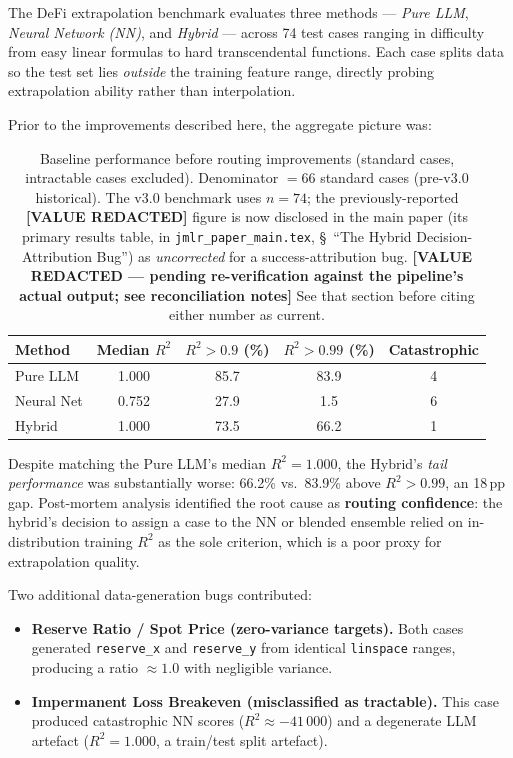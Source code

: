 \documentclass[twoside,11pt]{article}
\begin{document}
The DeFi extrapolation benchmark evaluates three methods --- \emph{Pure LLM},
\emph{Neural Network (NN)}, and \emph{Hybrid} --- across 74 test cases ranging
in difficulty from easy linear formulas to hard transcendental functions.
Each case splits data so the test set lies \emph{outside} the training feature
range, directly probing extrapolation ability rather than interpolation.

Prior to the improvements described here, the aggregate picture was:

\begin{table}[h]
\centering
\caption{Baseline performance before routing improvements (standard cases,
         intractable cases excluded). Denominator $= 66$ standard cases
         (pre-v3.0 historical). The v3.0 benchmark uses $n=74$; the
         previously-reported \textbf{[VALUE REDACTED]} figure is now disclosed in the
         main paper (its primary results table, in
         \texttt{jmlr\_paper\_main.tex}, \S~``The Hybrid
         Decision-Attribution Bug'') as \emph{uncorrected} for a
         success-attribution bug. \textbf{[VALUE REDACTED --- pending re-verification against the pipeline's actual output; see reconciliation notes]}
         See that section before citing either number as current.}
\label{tab:baseline}
\begin{tabular}{lcccc}
\toprule
Method & Median $R^2$ & $R^2 > 0.9$ (\%) & $R^2 > 0.99$ (\%) & Catastrophic \\
\midrule
Pure LLM    & 1.000 & 85.7 & 83.9 & 4 \\
Neural Net  & 0.752 & 27.9 &  1.5 & 6 \\
Hybrid      & 1.000 & 73.5 & 66.2 & 1 \\
\bottomrule
\end{tabular}
\end{table}

Despite matching the Pure LLM's median $R^2 = 1.000$, the Hybrid's
\emph{tail performance} was substantially worse: 66.2\% vs.\ 83.9\% above
$R^2 > 0.99$, an 18\,pp gap.  Post-mortem analysis identified the root cause
as \textbf{routing confidence}: the hybrid's decision to assign a case to the
NN or blended ensemble relied on in-distribution training $R^2$ as the sole
criterion, which is a poor proxy for extrapolation quality.

Two additional data-generation bugs contributed:

\begin{itemize}[leftmargin=*]
  \item \textbf{Reserve Ratio / Spot Price (zero-variance targets).}
    Both cases generated \texttt{reserve\_x} and \texttt{reserve\_y} from
    identical \texttt{linspace} ranges, producing a ratio $\approx 1.0$ with
    negligible variance.
  \item \textbf{Impermanent Loss Breakeven (misclassified as tractable).}
    This case produced catastrophic NN scores ($R^2 \approx -41\,000$) and a
    degenerate LLM artefact ($R^2 = 1.000$, a train/test split artefact).
\end{itemize}
\end{document}
